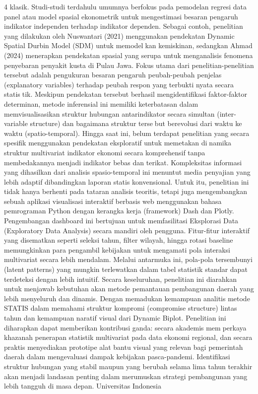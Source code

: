 4
klasik. Studi-studi terdahulu umumnya berfokus pada pemodelan regresi data panel atau
model spasial ekonometrik untuk mengestimasi besaran pengaruh indikator independen
terhadap indikator dependen. Sebagai contoh, penelitian yang dilakukan oleh Nuswantari
(2021) menggunakan pendekatan Dynamic Spatial Durbin Model (SDM) untuk memodelkan kemiskinan, sedangkan Ahmad (2024) menerapkan pendekatan spasial yang serupa
untuk menganalisis fenomena penyebaran penyakit kusta di Pulau Jawa. Fokus utama
dari penelitian-penelitian tersebut adalah pengukuran besaran pengaruh peubah-peubah
penjelas (explanatory variables) terhadap peubah respon yang terbukti nyata secara statistik. Meskipun pendekatan tersebut berhasil mengidentifikasi faktor-faktor determinan,
metode inferensial ini memiliki keterbatasan dalam memvisualisasikan struktur hubungan
antarindikator secara simultan (inter-variable structure) dan bagaimana struktur tersebut berevolusi dari waktu ke waktu (spatio-temporal). Hingga saat ini, belum terdapat
penelitian yang secara spesifik menggunakan pendekatan eksploratif untuk memetakan dinamika struktur multivariat indikator ekonomi secara komprehensif tanpa membedakannya
menjadi indikator bebas dan terikat.
Kompleksitas informasi yang dihasilkan dari analisis spasio-temporal ini menuntut
media penyajian yang lebih adaptif dibandingkan laporan statis konvensional. Untuk itu,
penelitian ini tidak hanya berhenti pada tataran analisis teoritis, tetapi juga mengembangkan
sebuah aplikasi visualisasi interaktif berbasis web menggunakan bahasa pemrograman
Python dengan kerangka kerja (framework) Dash dan Plotly. Pengembangan dashboard ini
bertujuan untuk memfasilitasi Eksplorasi Data (Exploratory Data Analysis) secara mandiri
oleh pengguna. Fitur-fitur interaktif yang disematkan seperti seleksi tahun, filter wilayah,
hingga rotasi baseline memungkinkan para pengambil kebijakan untuk mengamati pola
interaksi multivariat secara lebih mendalam. Melalui antarmuka ini, pola-pola tersembunyi
(latent patterns) yang mungkin terlewatkan dalam tabel statistik standar dapat terdeteksi
dengan lebih intuitif.
Secara keseluruhan, penelitian ini diarahkan untuk menjawab kebutuhan akan
metode pemantauan pembangunan daerah yang lebih menyeluruh dan dinamis. Dengan
memadukan kemampuan analitis metode STATIS dalam memahami struktur kompromi
(compromise structure) lintas tahun dan kemampuan naratif visual dari Dynamic Biplot.
Penelitian ini diharapkan dapat memberikan kontribusi ganda: secara akademis memperkaya khazanah penerapan statistik multivariat pada data ekonomi regional, dan secara
praktis menyediakan prototipe alat bantu visual yang relevan bagi pemerintah daerah dalam
mengevaluasi dampak kebijakan pasca-pandemi. Identifikasi struktur hubungan yang stabil
maupun yang berubah selama lima tahun terakhir akan menjadi landasan penting dalam
merumuskan strategi pembangunan yang lebih tangguh di masa depan.
Universitas Indonesia

